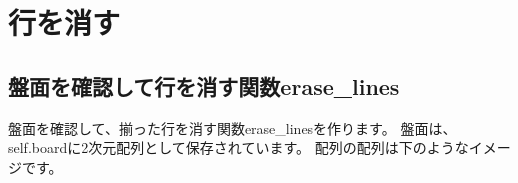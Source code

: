 \chapter{行を消す}
\section{盤面を確認して行を消す関数erase\_lines}
盤面を確認して、揃った行を消す関数erase\_linesを作ります。
盤面は、self.boardに2次元配列として保存されています。
配列の配列は下のようなイメージです。